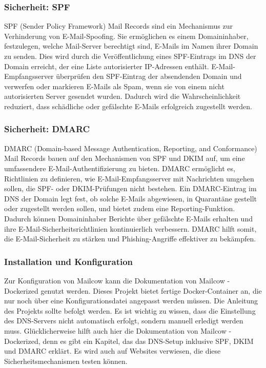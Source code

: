\subsubsection{Sicherheit: SPF}
SPF (Sender Policy Framework) Mail Records sind ein Mechanismus zur Verhinderung von E-Mail-Spoofing. Sie ermöglichen es einem Domaininhaber, festzulegen, welche Mail-Server berechtigt sind, E-Mails im Namen ihrer Domain zu senden. Dies wird durch die Veröffentlichung eines SPF-Eintrags im DNS der Domain erreicht, der eine Liste autorisierter IP-Adressen enthält. E-Mail-Empfangsserver überprüfen den SPF-Eintrag der absendenden Domain und verwerfen oder markieren E-Mails als Spam, wenn sie von einem nicht autorisierten Server gesendet wurden. Dadurch wird die Wahrscheinlichkeit reduziert, dass schädliche oder gefälschte E-Mails erfolgreich zugestellt werden.

\subsubsection{Sicherheit: DMARC}
DMARC (Domain-based Message Authentication, Reporting, and Conformance) Mail Records bauen auf den Mechanismen von SPF und DKIM auf, um eine umfassendere E-Mail-Authentifizierung zu bieten. DMARC ermöglicht es, Richtlinien zu definieren, wie E-Mail-Empfangsserver mit Nachrichten umgehen sollen, die SPF- oder DKIM-Prüfungen nicht bestehen. Ein DMARC-Eintrag im DNS der Domain legt fest, ob solche E-Mails abgewiesen, in Quarantäne gestellt oder zugestellt werden sollen, und bietet zudem eine Reporting-Funktion. Dadurch können Domaininhaber Berichte über gefälschte E-Mails erhalten und ihre E-Mail-Sicherheitsrichtlinien kontinuierlich verbessern. DMARC hilft somit, die E-Mail-Sicherheit zu stärken und Phishing-Angriffe effektiver zu bekämpfen.

\subsubsection{Installation und Konfiguration}
Zur Konfiguration von Mailcow kann die Dokumentation von Mailcow - Dockerized genutzt werden. Dieses Projekt bietet fertige Docker-Container an, die nur noch über eine Konfigurationsdatei angepasst werden müssen. Die Anleitung des Projekts sollte befolgt werden. Es ist wichtig zu wissen, dass die Einstellung des DNS-Servers nicht automatisch erfolgt, sondern manuell erledigt werden muss. Glücklicherweise hilft auch hier die Dokumentation von Mailcow - Dockerized, denn es gibt ein Kapitel, das das DNS-Setup inklusive SPF, DKIM und DMARC erklärt. Es wird auch auf Websites verwiesen, die diese Sicherheitsmechanismen testen können.

